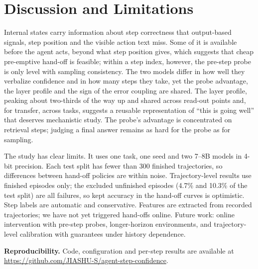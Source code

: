 \documentclass[10pt,twocolumn]{article}
\begin{document}
\section{Discussion and Limitations}
Internal states carry information about step correctness that output-based signals, step position and the visible
action text miss. Some
of it is available before the agent acts, beyond what step position gives, which suggests that cheap pre-emptive
hand-off is feasible; within a step index, however, the pre-step probe is only level with sampling consistency. The two models differ in how well they
verbalize confidence and in how many steps they take, yet the probe advantage, the layer profile and the sign of the
error coupling are shared. The layer profile, peaking about two-thirds of the way up and shared across
read-out points and, for transfer, across tasks, suggests a reusable representation of ``this is going well'' that
deserves mechanistic study. The probe's advantage is concentrated on retrieval steps; judging a final answer
remains as hard for the probe as for sampling.

The study has clear limits. It uses one task, one seed and two 7--8B models in 4-bit precision. Each test split has
fewer than 300 finished trajectories, so differences between hand-off policies are within noise. Trajectory-level
results use finished episodes only; the excluded unfinished episodes (4.7\% and 10.3\% of the test split) are all
failures, so kept accuracy in the hand-off curves is optimistic. Step labels are automatic and
conservative. Features are extracted from recorded trajectories; we have not yet triggered hand-offs online.
Future work: online intervention with pre-step probes, longer-horizon environments, and trajectory-level
calibration with guarantees under history dependence.

\textbf{Reproducibility.} Code, configuration and per-step results are available at \url{https://github.com/JIASHU-S/agent-step-confidence}.

\footnotesize
\setlength{\bibsep}{0pt plus 0.3pt}


\end{document}
